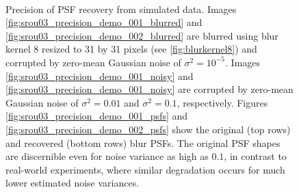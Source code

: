 \documentclass[12pt,notitlepage]{report}
\begin{document}
\begin{figure}[h]
	  ~
	  ~
  \caption[Precision of PSF recovery from simulated data]{Precision of PSF recovery from simulated data. Images \ref{fig:srou03_precision_demo_001_blurred} and \ref{fig:srou03_precision_demo_002_blurred} are blurred using blur kernel 8 resized to 31 by 31 pixels (see \ref{fig:blurkernel8}) and corrupted by zero-mean Gaussian noise of $\sigma^2 = 10^{-5}$. Images \ref{fig:srou03_precision_demo_001_noisy} and \ref{fig:srou03_precision_demo_001_noisy} are corrupted by zero-mean Gaussian noise of $\sigma^2 = 0.01$ and $\sigma^2 = 0.1$, respectively. Figures \ref{fig:srou03_precision_demo_001_psfs} and \ref{fig:srou03_precision_demo_002_psfs} show the original (top rows) and recovered (bottom rows) blur PSFs. The original PSF shapes are discernible even for noise variance as high as $0.1$, in contrast to real-world experiments, where similar degradation occurs for much lower estimated noise variances.}  
  \label{fig:srou03_precision_demo}
\end{figure}
\end{document}
